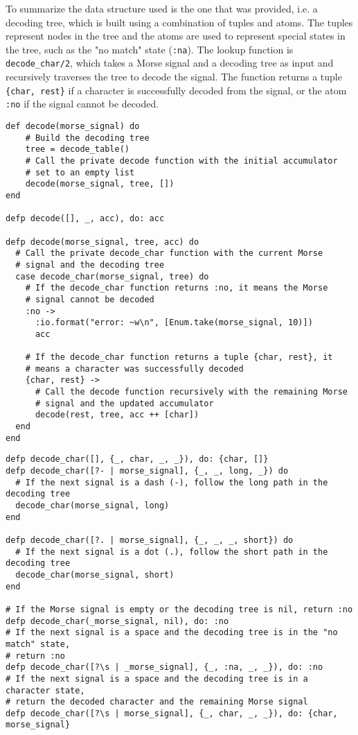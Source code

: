 \documentclass[a4paper,11pt]{article}
\newenvironment{code}{\captionsetup{type=listing}}{}
\begin{document}
To summarize the data structure used is the one that was provided, i.e. a decoding tree, which is built using a combination of tuples 
and atoms. The tuples represent nodes in the tree and the atoms are used to represent special states in the tree, such as the "no match" 
state ({\tt :na}). The lookup function is {\tt decode\_char/2}, which takes a Morse signal and a decoding tree as input and recursively 
traverses the tree to decode the signal. The function returns a tuple {\tt\{char, rest\}} if a character is successfully decoded from the 
signal, or the atom {\tt:no} if the signal cannot be decoded.

\begin{code}
\label{code:decode}
\begin{verbatim}
def decode(morse_signal) do
    # Build the decoding tree
    tree = decode_table()
    # Call the private decode function with the initial accumulator 
    # set to an empty list
    decode(morse_signal, tree, [])
end

defp decode([], _, acc), do: acc

defp decode(morse_signal, tree, acc) do
  # Call the private decode_char function with the current Morse 
  # signal and the decoding tree
  case decode_char(morse_signal, tree) do
    # If the decode_char function returns :no, it means the Morse 
    # signal cannot be decoded
    :no ->
      :io.format("error: ~w\n", [Enum.take(morse_signal, 10)])
      acc

    # If the decode_char function returns a tuple {char, rest}, it 
    # means a character was successfully decoded
    {char, rest} ->
      # Call the decode function recursively with the remaining Morse 
      # signal and the updated accumulator
      decode(rest, tree, acc ++ [char])
  end
end
\end{verbatim}
\end{code}
\begin{code}
\label{code:decodeChar}
\begin{verbatim}
defp decode_char([], {_, char, _, _}), do: {char, []}
defp decode_char([?- | morse_signal], {_, _, long, _}) do
  # If the next signal is a dash (-), follow the long path in the decoding tree
  decode_char(morse_signal, long)
end

defp decode_char([?. | morse_signal], {_, _, _, short}) do
  # If the next signal is a dot (.), follow the short path in the decoding tree
  decode_char(morse_signal, short)
end

# If the Morse signal is empty or the decoding tree is nil, return :no
defp decode_char(_morse_signal, nil), do: :no
# If the next signal is a space and the decoding tree is in the "no match" state, 
# return :no
defp decode_char([?\s | _morse_signal], {_, :na, _, _}), do: :no
# If the next signal is a space and the decoding tree is in a character state, 
# return the decoded character and the remaining Morse signal
defp decode_char([?\s | morse_signal], {_, char, _, _}), do: {char, morse_signal}
\end{verbatim}
\end{code}
\end{document}
